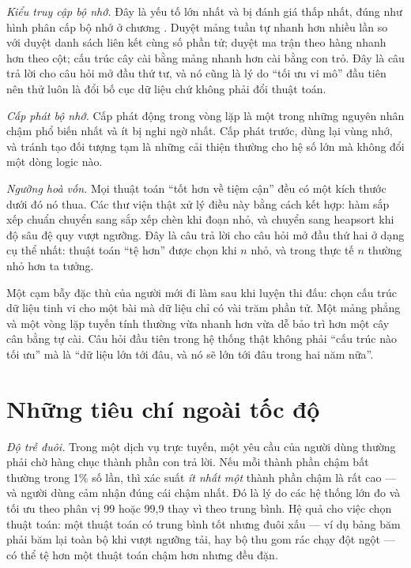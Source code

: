 \documentclass[../../algorithm.tex]{subfiles}
\begin{document}
\emph{Kiểu truy cập bộ nhớ.} Đây là yếu tố lớn nhất và bị đánh giá thấp nhất, đúng như hình phân cấp bộ nhớ ở chương . Duyệt mảng tuần tự nhanh hơn nhiều lần so với duyệt danh sách liên kết cùng số phần tử; duyệt ma trận theo hàng nhanh hơn theo cột; cấu trúc cây cài bằng mảng nhanh hơn cài bằng con trỏ. Đây là câu trả lời cho câu hỏi mở đầu thứ tư, và nó cũng là lý do ``tối ưu vi mô'' đầu tiên nên thử luôn là đổi bố cục dữ liệu chứ không phải đổi thuật toán.

\emph{Cấp phát bộ nhớ.} Cấp phát động trong vòng lặp là một trong những nguyên nhân chậm phổ biến nhất và ít bị nghi ngờ nhất. Cấp phát trước, dùng lại vùng nhớ, và tránh tạo đối tượng tạm là những cải thiện thường cho hệ số lớn mà không đổi một dòng logic nào.

\emph{Ngưỡng hoà vốn.} Mọi thuật toán ``tốt hơn về tiệm cận'' đều có một kích thước dưới đó nó thua. Các thư viện thật xử lý điều này bằng cách kết hợp: hàm sắp xếp chuẩn chuyển sang sắp xếp chèn khi đoạn nhỏ\cite{bentley1993sort}, và chuyển sang heapsort khi độ sâu đệ quy vượt ngưỡng\cite{musser1997}. Đây là câu trả lời cho câu hỏi mở đầu thứ hai ở dạng cụ thể nhất: thuật toán ``tệ hơn'' được chọn khi \(n\) nhỏ, và trong thực tế \(n\) thường nhỏ hơn ta tưởng.

\begin{cambay}
Một cạm bẫy đặc thù của người mới đi làm sau khi luyện thi đấu: chọn cấu trúc dữ liệu tinh vi cho một bài mà dữ liệu chỉ có vài trăm phần tử. Một mảng phẳng và một vòng lặp tuyến tính thường vừa nhanh hơn vừa dễ bảo trì hơn một cây cân bằng tự cài. Câu hỏi đầu tiên trong hệ thống thật không phải ``cấu trúc nào tối ưu'' mà là ``dữ liệu lớn tới đâu, và nó sẽ lớn tới đâu trong hai năm nữa''.
\end{cambay}

\section{Những tiêu chí ngoài tốc độ}

\emph{Độ trễ đuôi.} Trong một dịch vụ trực tuyến, một yêu cầu của người dùng thường phải chờ hàng chục thành phần con trả lời. Nếu mỗi thành phần chậm bất thường trong 1\% số lần, thì xác suất \emph{ít nhất một} thành phần chậm là rất cao --- và người dùng cảm nhận đúng cái chậm nhất. Đó là lý do các hệ thống lớn đo và tối ưu theo phân vị 99 hoặc 99,9 thay vì theo trung bình. Hệ quả cho việc chọn thuật toán: một thuật toán có trung bình tốt nhưng đuôi xấu --- ví dụ bảng băm phải băm lại toàn bộ khi vượt ngưỡng tải, hay bộ thu gom rác chạy đột ngột --- có thể tệ hơn một thuật toán chậm hơn nhưng đều đặn.
\end{document}
